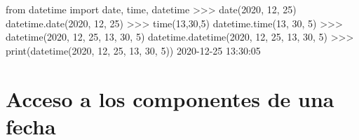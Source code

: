 \documentclass[
  spanish,
  a4paper,
]{scrreport}
\newenvironment{Shaded}{\begin{snugshade}}{\end{snugshade}}
\newcommand{\BuiltInTok}[1]{\textcolor[rgb]{0.00,0.23,0.31}{#1}}
\newcommand{\DecValTok}[1]{\textcolor[rgb]{0.68,0.00,0.00}{#1}}
\newcommand{\ErrorTok}[1]{\textcolor[rgb]{0.68,0.00,0.00}{#1}}
\newcommand{\ImportTok}[1]{\textcolor[rgb]{0.00,0.46,0.62}{#1}}
\newcommand{\NormalTok}[1]{\textcolor[rgb]{0.00,0.23,0.31}{#1}}
\newcommand{\OperatorTok}[1]{\textcolor[rgb]{0.37,0.37,0.37}{#1}}
\begin{document}
\begin{Shaded}
\begin{Highlighting}[]
\ImportTok{from}\NormalTok{ datetime }\ImportTok{import}\NormalTok{ date, time, datetime}
\OperatorTok{\textgreater{}\textgreater{}\textgreater{}}\NormalTok{ date(}\DecValTok{2020}\NormalTok{, }\DecValTok{12}\NormalTok{, }\DecValTok{25}\NormalTok{)}
\NormalTok{datetime.date(}\DecValTok{2020}\NormalTok{, }\DecValTok{12}\NormalTok{, }\DecValTok{25}\NormalTok{)}
\OperatorTok{\textgreater{}\textgreater{}\textgreater{}}\NormalTok{ time(}\DecValTok{13}\NormalTok{,}\DecValTok{30}\NormalTok{,}\DecValTok{5}\NormalTok{)}
\NormalTok{datetime.time(}\DecValTok{13}\NormalTok{, }\DecValTok{30}\NormalTok{, }\DecValTok{5}\NormalTok{)}
\OperatorTok{\textgreater{}\textgreater{}\textgreater{}}\NormalTok{ datetime(}\DecValTok{2020}\NormalTok{, }\DecValTok{12}\NormalTok{, }\DecValTok{25}\NormalTok{, }\DecValTok{13}\NormalTok{, }\DecValTok{30}\NormalTok{, }\DecValTok{5}\NormalTok{)}
\NormalTok{datetime.datetime(}\DecValTok{2020}\NormalTok{, }\DecValTok{12}\NormalTok{, }\DecValTok{25}\NormalTok{, }\DecValTok{13}\NormalTok{, }\DecValTok{30}\NormalTok{, }\DecValTok{5}\NormalTok{)}
\OperatorTok{\textgreater{}\textgreater{}\textgreater{}} \BuiltInTok{print}\NormalTok{(datetime(}\DecValTok{2020}\NormalTok{, }\DecValTok{12}\NormalTok{, }\DecValTok{25}\NormalTok{, }\DecValTok{13}\NormalTok{, }\DecValTok{30}\NormalTok{, }\DecValTok{5}\NormalTok{))}
\DecValTok{2020}\OperatorTok{{-}}\DecValTok{12}\OperatorTok{{-}}\DecValTok{25} \DecValTok{13}\NormalTok{:}\DecValTok{30}\NormalTok{:}\DecValTok{0}\ErrorTok{5}
\end{Highlighting}
\end{Shaded}

\section{Acceso a los componentes de una
fecha}\label{acceso-a-los-componentes-de-una-fecha}
\end{document}

